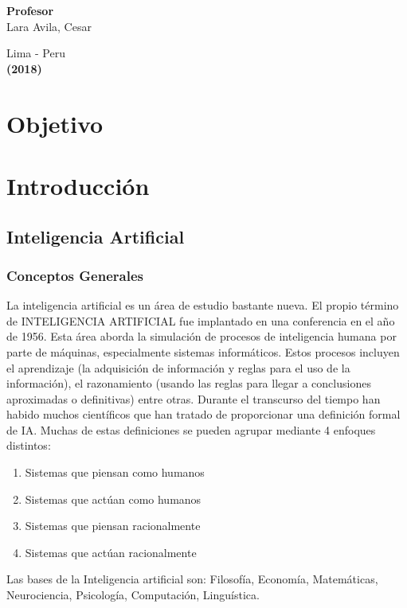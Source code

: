 \documentclass[a4paper]{article}
\begin{document}
\begin{titlepage}
\begin{center}
\vspace*{0.4in}
\begin{large}
{\bf Profesor} 
\vspace*{0.1in}
\\Lara Avila, Cesar
\end{large}

\end{center}
\begin{center}
\begin{large}
\vspace*{1.0in}
Lima - Peru\\
{\bf (2018)}
\end{large}
\end{center}
\end{titlepage}

\pagebreak
\tableofcontents
\pagebreak
\section{Objetivo}

\pagebreak
\section{Introducci\'on}
\subsection{Inteligencia Artificial}
\subsubsection{Conceptos Generales}
La inteligencia artificial es un área de estudio bastante nueva. El propio término de INTELIGENCIA ARTIFICIAL fue implantado en una conferencia en el año de 1956. Esta área aborda la simulación de procesos de inteligencia humana por parte de máquinas, especialmente sistemas informáticos. Estos procesos incluyen el aprendizaje (la adquisición de información y reglas para el uso de la información), el razonamiento (usando las reglas para llegar a conclusiones aproximadas o definitivas) entre otras.
Durante el transcurso del tiempo han habido muchos científicos que han tratado de proporcionar una definición formal de IA. Muchas de estas definiciones se pueden agrupar mediante 4 enfoques distintos:

\begin{enumerate}
\item Sistemas que piensan como humanos
\item Sistemas que actúan como humanos
\item Sistemas que piensan racionalmente
\item Sistemas que actúan racionalmente
\end{enumerate}
Las bases de la Inteligencia artificial son: Filosofía, Economía, Matemáticas, Neurociencia, Psicología, Computación, Linguística.
\end{document}
